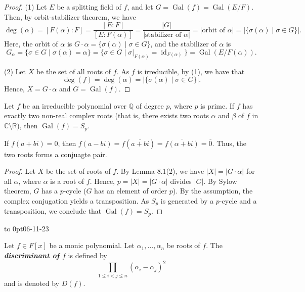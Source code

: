 \documentclass[twoside]{article}
\DeclareMathOperator\Gal{Gal}
\DeclareMathOperator\id{id}
\newcommand\Q{\mathbb Q}
\newcommand\R{\mathbb R}
\newcommand\C{\mathbb C}
\theoremstyle{remark}
\newcounter{theorem}
\newcommand*\term[1]{\textbf{\textit{\mathversion{bold}#1}}}
\newcommand*\newclass[1]{\par\vbox to 0pt{\hbox{\tiny\sffamily\color{gray}#1}} \par\ignorespaces}
\begin{document}
\begin{proof}
  (1) Let \(E\) be a splitting field of \(f\), and let \(G = \Gal(f) = \Gal(E/F)\). Then, by orbit-stabilizer theorem, we have
  \[ \deg(\alpha) = [F(\alpha):F] = \frac{[E:F]}{[E:F(\alpha)]} = \frac{|G|}{|\text{stabilizer of \(\alpha\)}|} = |\text{orbit of \(\alpha\)}| = |\{\sigma(\alpha) \mid \sigma \in G\}|. \]
  Here, the orbit of \(\alpha\) is \(G\cdot\alpha = \{\sigma(\alpha) \mid \sigma\in G\}\), and the stabilizer of \(\alpha\) is
  \[ G_\alpha = \{\sigma \in G \mid \sigma(\alpha) = \alpha\} = \{\sigma \in G \mid \sigma|_{F(\alpha)} = \id_{F(\alpha)}\} = \Gal(E/F(\alpha)). \]
  
  \smallskip
  
  (2) Let \(X\) be the set of all roots of \(f\). As \(f\) is irreducible, by (1), we have that
  \[ \deg(f) = \deg(\alpha) = |\{\sigma(\alpha) \mid \sigma \in G\}|. \]
  Hence, \(X = G \cdot \alpha\) and \(G = \Gal(f)\).
\end{proof}

\begin{corollary}
  Let \(f\) be an irreducible polynomial over \(\Q\) of degree \(p\), where \(p\) is prime. If \(f\) has exactly two non-real complex roots (that is, there exists two roots \(\alpha\) and \(\beta\) of \(f\) in \(\C \setminus \R\)), then \(\Gal(f) = S_p\).
\end{corollary}

If \(f(a+bi) = 0\), then \(f(a-bi) = f(\overline{a+bi}) = \overline{f(\alpha+bi)} = \overline{0}\). Thus, the two roots forms a conjuagte pair.

\begin{proof}
  Let \(X\) be the set of roots of \(f\). By Lemma 8.1(2), we have \(|X| = |G \cdot \alpha|\) for all \(\alpha\), where \(\alpha\) is a root of \(f\). Hence, \(p = |X| = |G \cdot \alpha|\) divides \(|G|\). By Sylow theorem, \(G\) has a \(p\)-cycle (\(G\) has an element of order \(p\)). By the assumption, the complex conjugation yields a transposition. As \(S_p\) is generated by a \(p\)-cycle and a transposition, we conclude that \(\Gal(f) = S_p\).
\end{proof}

\newclass{06-11-23}

\begin{definition}
  Let \(f \in F[x]\) be a monic polynomial. Let \(\alpha_1, \dots, \alpha_n\) be roots of \(f\). The \term{discriminant of \(f\)} is defined by
  \[ \prod_{1 \leq i < j \leq n} (\alpha_i - \alpha_j)^2 \]
  and is denoted by \(D(f)\).
\end{definition}
\end{document}
